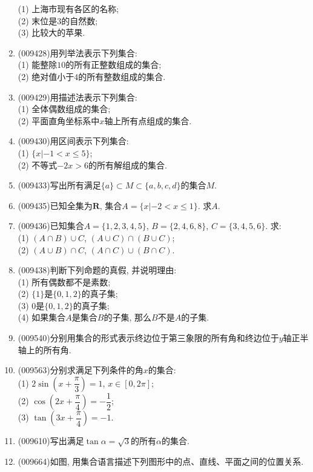 \documentclass[10pt,a4paper]{article}
\begin{document}
\begin{enumerate}[1.]
(1) 上海市现有各区的名称;\\
(2) 末位是$3$的自然数;\\
(3) 比较大的苹果.
\item {\tiny (009428)}用列举法表示下列集合:\\
(1) 能整除$10$的所有正整数组成的集合;\\
(2) 绝对值小于$4$的所有整数组成的集合.
\item {\tiny (009429)}用描述法表示下列集合:\\
(1) 全体偶数组成的集合;\\
(2) 平面直角坐标系中$x$轴上所有点组成的集合.
\item {\tiny (009430)}用区间表示下列集合:\\
(1) $\{x|-1<x\le 5\}$;\\
(2) 不等式$-2x>6$的所有解组成的集合.
\item {\tiny (009433)}写出所有满足$\{a\}\subset M\subset \{a, b, c, d\}$的集合$M$.
\item {\tiny (009435)}已知全集为$\mathbf{R}$, 集合$A=\{x|-2<x\le 1\}$. 求$A$.
\item {\tiny (009436)}已知集合$A=\{1, 2, 3, 4, 5\}$, $B=\{2, 4, 6, 8\}$, $C=\{3, 4, 5, 6\}$. 求:\\
(1) $(A\cap B)\cup C$, $(A\cup C)\cap (B\cup C)$;\\
(2) $(A\cup B)\cap C$, $(A\cap C)\cup (B\cap C)$.
\item {\tiny (009438)}判断下列命题的真假, 并说明理由:\\
(1) 所有偶数都不是素数;\\
(2) $\{1\}$是$\{0, 1, 2\}$的真子集;\\
(3) $0$是$\{0, 1, 2\}$的真子集;\\
(4) 如果集合$A$是集合$B$的子集, 那么$B$不是$A$的子集.
\item {\tiny (009540)}分别用集合的形式表示终边位于第三象限的所有角和终边位于$y$轴正半轴上的所有角.
\item {\tiny (009563)}分别求满足下列条件的角$x$的集合:\\
(1) $2\sin (x+\dfrac\pi 3)=1$, $x\in [0, 2\pi ]$;\\
(2) $\cos (2x+\dfrac \pi 4)=-\dfrac 12$;\\
(3) $\tan (3x+\dfrac \pi 4)=-1$.
\item {\tiny (009610)}写出满足$\tan \alpha=\sqrt 3$的所有$\alpha$的集合.
\item {\tiny (009664)}如图, 用集合语言描述下列图形中的点、直线、平面之间的位置关系.
\begin{center}

\end{center}
\end{enumerate}
\end{document}
